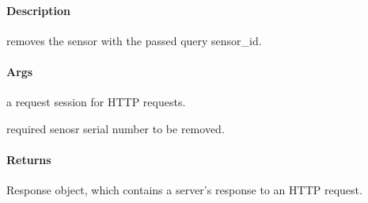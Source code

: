 \documentclass[letterpaper,10pt,english]{sphinxmanual}
\begin{document}
\begin{fulllineitems}
\label{\detokenize{gemini_perception_API:gemini_perception_API.remove_sensor}}
\pysigstartsignatures
{}
\pysigstopsignatures

\paragraph{Description}
\label{\detokenize{gemini_perception_API:id29}}
\sphinxAtStartPar
removes the sensor with the passed query sensor\_id.


\paragraph{Args}
\label{\detokenize{gemini_perception_API:id30}}\begin{description}
\sphinxAtStartPar
a request session for HTTP requests.

\sphinxAtStartPar
required senosr serial number to be removed.

\end{description}


\paragraph{Returns}
\label{\detokenize{gemini_perception_API:id31}}\begin{description}
\sphinxAtStartPar
Response object, which contains a server’s response to an HTTP request.

\end{description}

\end{fulllineitems}

\end{document}
